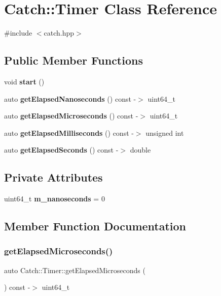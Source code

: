 \section{Catch\+::Timer Class Reference}
\label{class_catch_1_1_timer}


{\ttfamily \#include $<$catch.\+hpp$>$}

\subsection*{Public Member Functions}
\begin{DoxyCompactItemize}
\item 
void \textbf{ start} ()
\item 
auto \textbf{ get\+Elapsed\+Nanoseconds} () const -\/$>$ uint64\+\_\+t
\item 
auto \textbf{ get\+Elapsed\+Microseconds} () const -\/$>$ uint64\+\_\+t
\item 
auto \textbf{ get\+Elapsed\+Milliseconds} () const -\/$>$ unsigned int
\item 
auto \textbf{ get\+Elapsed\+Seconds} () const -\/$>$ double
\end{DoxyCompactItemize}
\subsection*{Private Attributes}
\begin{DoxyCompactItemize}
\item 
uint64\+\_\+t \textbf{ m\+\_\+nanoseconds} = 0
\end{DoxyCompactItemize}


\subsection{Member Function Documentation}
\mbox{\label{class_catch_1_1_timer_a545de17a61a6fee1dbe3de5b0723e5fa}} 
\subsubsection{getElapsedMicroseconds()}
{\footnotesize\ttfamily auto Catch\+::\+Timer\+::get\+Elapsed\+Microseconds (\begin{DoxyParamCaption}{ }\end{DoxyParamCaption}) const -\/$>$  uint64\+\_\+t}

